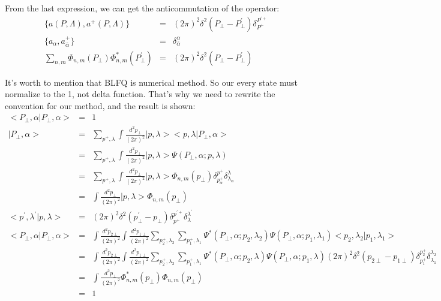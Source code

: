 \documentclass[a4paper,12pt]{article}
\begin{document}
From the last expression, we can get the anticommutation of the operator:
\begin{eqnarray}
  \{a(P,\Lambda),a^+(P,\Lambda)\} &=& (2\pi)^2 \delta^2(P_{\perp}-P^{\prime}_{\perp}) \delta_{P^+}^{P^{\prime +}} \nonumber\\
  \{a_{\alpha},a^+_{\bar{\alpha}}\} &=& \delta^{\alpha}_{\bar{\alpha}}\nonumber\\
  \sum_{n,m} \Phi_{n,m}(P_{\perp}) \Phi^{\ast}_{n,m}(P^{\prime}_{\perp}) &=& (2\pi)^2 \delta^2(P_{\perp}-P^{\prime}_{\perp})\nonumber\
\end{eqnarray}

It's worth to mention that BLFQ is numerical method. So our every state must normalize to the 1, not delta function. That's why we need to rewrite the convention for our method, and the result is shown:
\begin{eqnarray}
  <P_{\perp},\alpha|P_{\perp},\alpha> &=& 1\nonumber\\
  |P_{\perp},\alpha> &=& \sum_{p^+,\lambda} \int \frac{d^2 p_{\perp}}{(2\pi)^2}|p,\lambda><p,\lambda|P_{\perp},\alpha> \nonumber\\
  &=& \sum_{p^+,\lambda} \int \frac{d^2 p_{\perp}}{(2\pi)^2}|p,\lambda> \Psi(P_{\perp},\alpha;p,\lambda)\nonumber\\
  &=& \sum_{p^+,\lambda} \int \frac{d^2 p_{\perp}}{(2\pi)^2}|p,\lambda> \Phi_{n,m}(p_{\perp})\delta^{p^+}_{p^+_{\alpha}}\delta^{\lambda}_{\lambda_{\alpha}}\nonumber\\
  &=& \int \frac{d^2 p_{\perp}}{(2\pi)^2}|p,\lambda> \Phi_{n,m}(p_{\perp})\label{App2.1}\\
  <p^{\prime},\lambda^{\prime}|p,\lambda> &=& (2\pi)^2\delta^2(p^{\prime}_{\perp}-p_{\perp}) \delta^{p^{\prime +}}_{p^+}\delta^{\lambda^{\prime}}_{\lambda}\nonumber\\
  <P_{\perp},\alpha|P_{\perp},\alpha> &=& \int \frac{d^2 p_{2\perp}}{(2\pi)^2}\int \frac{d^2 p_{1\perp}}{(2\pi)^2} \sum_{p^+_2,\lambda_2}\sum_{p^+_1,\lambda_1} \Psi^{\ast}(P_{\perp},\alpha; p_2,\lambda_2)\Psi(P_{\perp},\alpha; p_1,\lambda_1) <p_2,\lambda_2|p_1,\lambda_1> \nonumber\\
  &=& \int \frac{d^2 p_{2\perp}}{(2\pi)^2}\int \frac{d^2 p_{1\perp}}{(2\pi)^2}  \sum_{p^+_2,\lambda_2}\sum_{p^+_1,\lambda_1}\Psi^{\ast}(P_{\perp},\alpha; p_{2},\lambda)\Psi(P_{\perp},\alpha; p_{1},\lambda) (2\pi)^2\delta^2(p_{2\perp}-p_{1\perp}) \delta^{p^{ +}_2}_{p^+_1}\delta^{\lambda_2}_{\lambda_1} \nonumber\\
  &=& \int \frac{d^2 p_{\perp}}{(2\pi)^2} \Phi^{\ast}_{n,m}(p_{\perp})\Phi_{n,m}(p_{\perp})\nonumber\\ &=& 1 \nonumber\
\end{eqnarray}
\end{document}
